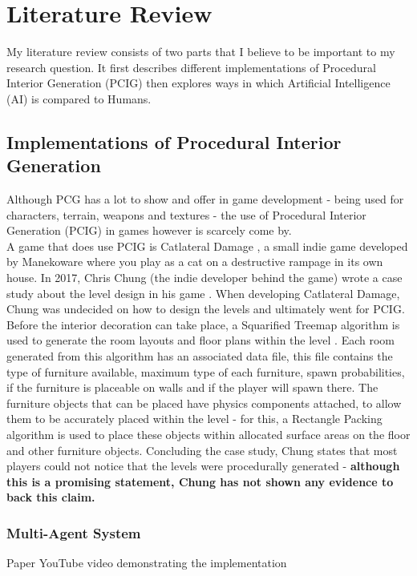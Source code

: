 \section{Literature Review}
My literature review consists of two parts that I believe to be important to my research question.
It first describes different implementations of Procedural Interior Generation (PCIG) then explores
ways in which Artificial Intelligence (AI) is compared to Humans.

\subsection{Implementations of Procedural Interior Generation}
Although PCG has a lot to show and offer in game development - being used for
characters, terrain, weapons and textures - the use of Procedural Interior Generation 
(PCIG) in games however is scarcely come by.
\\
A game that does use PCIG is Catlateral Damage \cite{game:catlateral},
a small indie game developed by Manekoware where you play as a cat on a destructive rampage 
in its own house.
In 2017, Chris Chung (the indie developer behind the game) wrote a case study about the level design in his game \cite{what-is-pcg}.
When developing Catlateral Damage, Chung was 
undecided on how to design the levels and ultimately went for PCIG\cite{pcg_in_gd}.
Before the interior decoration can take place, a Squarified Treemap algorithm 
is used to generate the room layouts and floor plans within the level \cite{squarified-treemap}.
Each room generated from this algorithm has an associated data file, this file contains the type of furniture available, 
maximum type of each furniture, spawn probabilities, if the furniture is placeable on walls and if the player will spawn there.
The furniture objects that can be placed have physics components attached, to allow them to be accurately placed within the level -
for this, a Rectangle Packing algorithm is used to place these objects within allocated surface areas on the floor and other furniture objects.
Concluding the case study, Chung states that most players could not notice that the levels were procedurally generated -
\textbf{although this is a promising statement, Chung has not shown any evidence to back this claim.}


\subsubsection*{Multi-Agent System}
Paper \cite{real-time-walkthroughs} YouTube video demonstrating the implementation \cite{youtube:real-time-walkthroughs}
